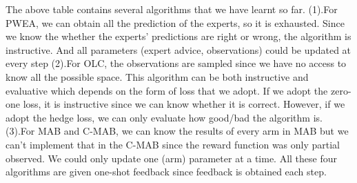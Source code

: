 \documentclass[11pt]{article}
\begin{document}
The above table contains several algorithms that we have learnt so far. (1).For PWEA, we can obtain all the prediction of the experts, so it is exhausted. Since we know the whether the experts' predictions are right or wrong, the algorithm is instructive. And all parameters (expert advice, observations) could be updated at every step (2).For OLC, the observations are sampled since we have no access to know all the possible space. This algorithm can be both instructive and evaluative which depends on the form of loss that we adopt. If we adopt the zero-one loss, it is instructive since we can know whether it is correct. However, if we adopt the hedge loss, we can only evaluate how good/bad the algorithm is. (3).For MAB and C-MAB, we can know the results of every arm in MAB but we can't implement that in the C-MAB since the reward function was only partial observed.
We could only update one (arm) parameter at a time. All these four algorithms are given one-shot feedback since feedback is obtained each step.



\end{document}
